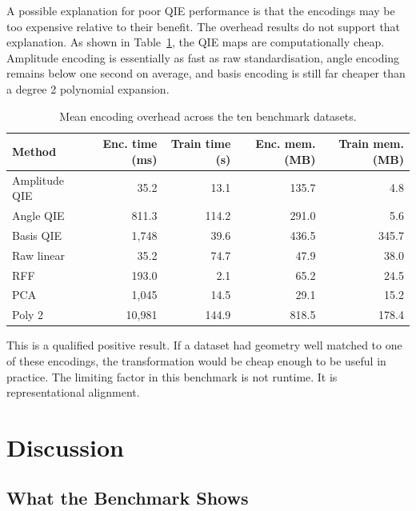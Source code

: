 \documentclass[12pt]{article}
\begin{document}
A possible explanation for poor QIE performance is that the encodings may be too
expensive relative to their benefit. The overhead results do not support that
explanation. As shown in Table~\ref{tab:overhead}, the QIE maps are
computationally cheap. Amplitude encoding is essentially as fast as raw
standardisation, angle encoding remains below one second on average, and
basis encoding is still far cheaper than a degree 2 polynomial expansion.

\begin{table}[tbp]
\centering
\caption{Mean encoding overhead across the ten benchmark datasets.}
\label{tab:overhead}
\small
\begin{tabular}{lrrrr}
\toprule
Method & Enc. time (ms) & Train time (s) & Enc. mem. (MB) & Train mem. (MB) \\
\midrule
Amplitude QIE &     35.2 &    13.1 & 135.7 &   4.8 \\
Angle QIE     &    811.3 &   114.2 & 291.0 &   5.6 \\
Basis QIE     &  1{,}748 &    39.6 & 436.5 & 345.7 \\
\midrule
Raw linear    &     35.2 &    74.7 &  47.9 &  38.0 \\
RFF           &    193.0 &     2.1 &  65.2 &  24.5 \\
PCA           &  1{,}045 &    14.5 &  29.1 &  15.2 \\
Poly 2        & 10{,}981 &   144.9 & 818.5 & 178.4 \\
\bottomrule
\end{tabular}
\end{table}

This is a qualified positive result. If a dataset had geometry well matched to
one of these encodings, the transformation would be cheap enough to be useful in
practice. The limiting factor in this benchmark is not runtime. It is
representational alignment.

\clearpage

\section{Discussion}
\label{sec:discussion}

\subsection{What the Benchmark Shows}
\end{document}
